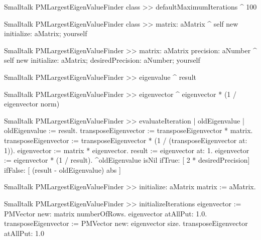 \begin{displaycode}{Smalltalk}
PMLargestEigenValueFinder class >> defaultMaximumIterations
    ^ 100
\end{displaycode}

\begin{displaycode}{Smalltalk}
PMLargestEigenValueFinder class >> matrix: aMatrix
    ^ self new initialize: aMatrix; yourself
\end{displaycode}

\begin{displaycode}{Smalltalk}
PMLargestEigenValueFinder >> matrix: aMatrix precision: aNumber
    ^ self new initialize: aMatrix;
               desiredPrecision: aNumber;
               yourself
\end{displaycode}

\begin{displaycode}{Smalltalk}
PMLargestEigenValueFinder >> eigenvalue
    ^ result
\end{displaycode}

\begin{displaycode}{Smalltalk}
PMLargestEigenValueFinder >> eigenvector
    ^ eigenvector * (1 / eigenvector norm)
\end{displaycode}

\begin{displaycode}{Smalltalk}
PMLargestEigenValueFinder >> evaluateIteration
    | oldEigenvalue |
    oldEigenvalue := result.
    transposeEigenvector := transposeEigenvector * matrix.
    transposeEigenvector := transposeEigenvector 
                * (1 / (transposeEigenvector at: 1)).
    eigenvector := matrix * eigenvector.
    result := eigenvector at: 1.
    eigenvector := eigenvector * (1 / result).
    ^oldEigenvalue isNil 
        ifTrue: [ 2 * desiredPrecision]
        ifFalse: [ (result - oldEigenvalue) abs ]
\end{displaycode}

\begin{displaycode}{Smalltalk}
PMLargestEigenValueFinder >> initialize: aMatrix
    matrix := aMatrix.
\end{displaycode}

\begin{displaycode}{Smalltalk}
PMLargestEigenValueFinder >> initializeIterations
    eigenvector := PMVector new: matrix numberOfRows.
    eigenvector atAllPut: 1.0.
    transposeEigenvector := PMVector new: eigenvector size.
    transposeEigenvector atAllPut: 1.0
\end{displaycode}

